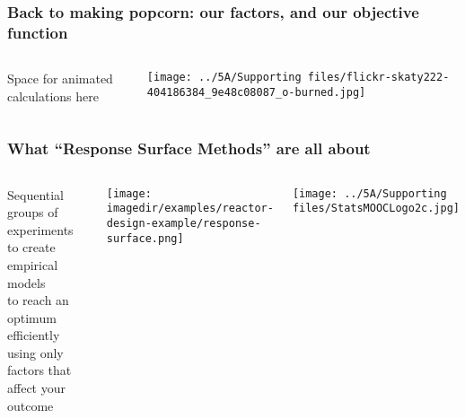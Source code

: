 \begin{frame}\frametitle{Back to making popcorn: our factors, and our objective function}
	\begin{columns}[T]
			\vspace{6cm}
			{\tiny Space for animated calculations here}

			\texttt{[image: ../5A/Supporting files/flickr-skaty222-404186384\_9e48c08087\_o-burned.jpg]}
			
			
	\end{columns}
	
\end{frame}

\begin{frame}\frametitle{What ``Response Surface Methods'' are all about}
	
	\begin{columns}[c]
			\begin{exampleblock}{}
				Sequential groups of experiments\\
				to create empirical models\\
				to reach an optimum\\
				efficiently\\
				using only factors that affect your outcome
			\end{exampleblock}
	
			\texttt{[image: \\imagedir/examples/reactor-design-example/response-surface.png]}
			
			\texttt{[image: ../5A/Supporting files/StatsMOOCLogo2c.jpg]}
	\end{columns}
	
\end{frame}

